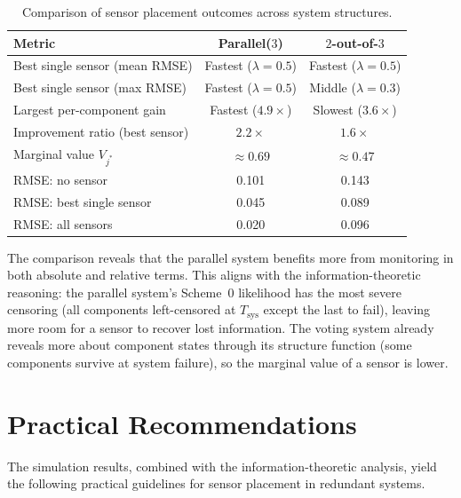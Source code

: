 \documentclass[12pt]{article}
\theoremstyle{definition}
\theoremstyle{remark}
\begin{document}
\begin{table}[t]
\centering
\caption{Comparison of sensor placement outcomes across system structures.}
\label{tab:comparison}
\begin{tabular}{lcc}
  \toprule
  Metric & Parallel($3$) & $2$-out-of-$3$ \\
  \midrule
  Best single sensor (mean RMSE)  & Fastest ($\lambda = 0.5$) & Fastest ($\lambda = 0.5$) \\
  Best single sensor (max RMSE)   & Fastest ($\lambda = 0.5$) & Middle ($\lambda = 0.3$) \\
  Largest per-component gain      & Fastest ($4.9\times$) & Slowest ($3.6\times$) \\
  Improvement ratio (best sensor) & $2.2\times$ & $1.6\times$ \\
  Marginal value $V_{j^*}$        & $\approx 0.69$ & $\approx 0.47$ \\[3pt]
  \midrule
  RMSE: no sensor                 & 0.101 & 0.143 \\
  RMSE: best single sensor        & 0.045 & 0.089 \\
  RMSE: all sensors               & 0.020 & 0.096 \\
  \bottomrule
\end{tabular}
\end{table}

The comparison reveals that the parallel system benefits more from
monitoring in both absolute and relative terms.  This aligns with the
information-theoretic reasoning: the parallel system's Scheme~0
likelihood has the most severe censoring (all components left-censored
at $T_{\mathrm{sys}}$ except the last to fail), leaving more room for
a sensor to recover lost information.  The voting system already
reveals more about component states through its structure function
(some components survive at system failure), so the marginal value of
a sensor is lower.


\section{Practical Recommendations}
\label{sec:recommendations}

The simulation results, combined with the information-theoretic
analysis, yield the following practical guidelines for sensor
placement in redundant systems.
\end{document}
